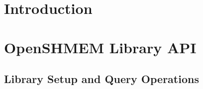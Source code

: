 \documentclass[10pt]{book}
\begin{document}
\hypersetup{pageanchor=true,citecolor=blue}

\pagestyle{fancy}
\fancyhead{}
\fancyhead[LE,LO]{\insertDocVersion}
\fancyfoot[CE,CO]{\thepage}

\setcounter{tocdepth}{3}
\tableofcontents
\mainmatter  %
\pagestyle{fancy} \withlinenumbers%
\fancyhf{}
\fancyhead[RE, LO]{\rightmark}
\fancyhead[RO, LE]{\thepage}
\renewcommand{\headrulewidth}{0pt}
\renewcommand{\thesection}{\arabic{section}}
{ %
\setlength{\parskip}{3pt} %
\startchap
\section*{Introduction}
\label{sec:intro}
%
%
%

\label{subsec:osh_project}

\label{subsec:programming_model}

\label{subsec:memory_model}

%

\label{subsec:library_constants}

\label{subsec:environment_variables}
\label{subsec:language_bindings}

\clearpage

\startchap
\section{OpenSHMEM Library API}
\label{sec:openshmem_library_api}
\subsection{Library Setup and Query Operations}%

\label{subsec:start_pes}
\label{subsec:shmem_pe_accessible}
\label{subsec:shmem_addr_accessible}
}
\end{document}

